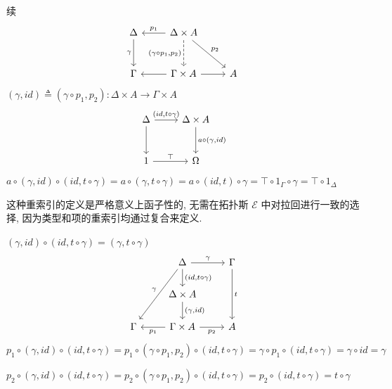 \documentclass[aspectratio=169,xcolor=dvipsnames]{beamer}
\newcommand\calE{\mathcal{E}}
\begin{document}
\begin{frame}{续}
\[
  \begin{tikzcd}[row sep=large]
  \Delta \arrow[d,"\gamma"'] & \Delta\times A \arrow[l,"p_1"'] \arrow[d,dashed,"{(\gamma\circ p_1,p_2)}"'] \arrow[dr,"p_2"] & \\
  \Gamma & \Gamma\times A \arrow[l] \arrow[r] & A
  \end{tikzcd}
\]
$(\gamma,id) \triangleq (\gamma\circ p_1,p_2) : \Delta\times A \to\Gamma\times A$
\[
\begin{tikzcd}[row sep=large]
  \Delta \arrow[d] \arrow[r,"{(id,t\circ\gamma)}"] & \Delta\times A \arrow[d,"{a\circ(\gamma,id)}"]\\
  1 \arrow[r,"\top"] & \Omega
\end{tikzcd}
\]
$a\circ(\gamma,id)\circ(id,t\circ\gamma)=a\circ(\gamma,t\circ\gamma)=a\circ(id,t)\circ\gamma=\top\circ1_{\Gamma}\circ\gamma=\top\circ1_{\Delta}$

这种重索引的定义是严格意义上函子性的, 无需在拓扑斯 $\calE$ 中对拉回进行一致的选择, 因为类型和项的重索引均通过复合来定义.
\end{frame}

\begin{frame}[fragile]{$(\gamma,id)\circ(id,t\circ\gamma)=(\gamma,t\circ\gamma)$}
  \[
  \begin{tikzcd}
    & \Delta \arrow[d,"{(id,t\circ\gamma)}"] \arrow[ddl,"\gamma"'] \arrow[r,"\gamma"] & \Gamma \arrow[dd,"t"] \\
    & \Delta\times A \arrow[d,"{(\gamma,id)}"] & \\
    \Gamma & \Gamma\times A \arrow[l,"{p_1}"] \arrow[r,"{p_2}"'] & A
  \end{tikzcd}
  \]
  $p_1\circ(\gamma,id)\circ(id,t\circ\gamma)=p_1\circ(\gamma\circ p_1,p_2)\circ(id,t\circ\gamma)=\gamma\circ p_1 \circ (id,t\circ\gamma)=\gamma\circ id=\gamma$

  $p_2\circ(\gamma,id)\circ(id,t\circ\gamma)=p_2\circ(\gamma\circ p_1,p_2)\circ(id,t\circ\gamma)=p_2\circ(id,t\circ\gamma)=t\circ\gamma$
\end{frame}
\end{document}
